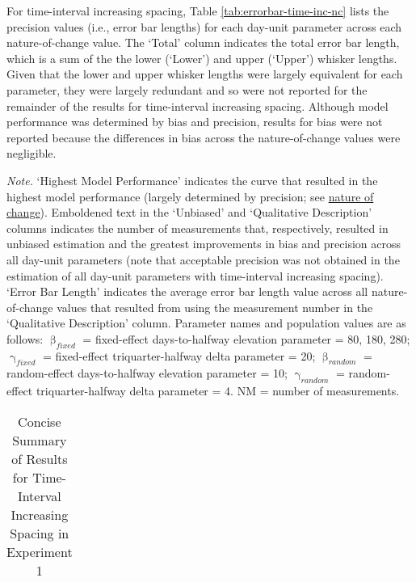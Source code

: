 \documentclass[
12pt, %
twoside,
english]{guelphthesis}
\begin{document}
For time-interval increasing spacing, Table \ref{tab:errorbar-time-inc-nc} lists the precision values (i.e., error bar lengths) for each day-unit parameter across each nature-of-change value. The `Total' column indicates the total error bar length, which is a sum of the the lower (`Lower') and upper (`Upper') whisker lengths. Given that the lower and upper whisker lengths were largely equivalent for each parameter, they were largely redundant and so were not reported for the remainder of the results for time-interval increasing spacing. Although model performance was determined by bias and precision, results for bias were not reported because the differences in bias across the nature-of-change values were negligible.

\begin{landscape}
\begin{ThreePartTable}
\begin{TableNotes}
\item \textit{Note. }`Highest Model Performance' indicates the curve that resulted in the highest model performance (largely determined by precision; see \hyperref[nature-change-time-inc-exp1]{nature of change}). Emboldened text in the `Unbiased' and `Qualitative Description' columns indicates the number of measurements that, respectively, resulted in unbiased estimation and the greatest improvements in bias and precision across all day-unit parameters (note that acceptable precision was not obtained in the estimation of all day-unit parameters with time-interval increasing spacing). `Error Bar Length' indicates the average error bar length value across all nature-of-change values that resulted from using the measurement number in the `Qualitative Description' column. Parameter names and population values are as follows: $\upbeta_{fixed}$ = fixed-effect days-to-halfway elevation parameter = {80, 180, 280}; $\upgamma_{fixed}$ = fixed-effect triquarter-halfway delta parameter = 20; $\upbeta_{random}$ = random-effect days-to-halfway elevation parameter = 10; $\upgamma_{random}$ = random-effect triquarter-halfway delta parameter = 4. NM = number of measurements.
\end{TableNotes}
\begin{longtable}[l]{>{\raggedright\arraybackslash}p{2cm}>{\centering\arraybackslash}p{5cm}>{\centering\arraybackslash}p{2.5cm}>{\centering\arraybackslash}p{3cm}>{\raggedright\arraybackslash}p{6.5cm}>{\centering\arraybackslash}p{3cm}}
\caption{\label{tab:summary-table-time-inc-exp1}Concise Summary of Results for Time-Interval Increasing Spacing in Experiment 1}\\

\end{longtable}
\end{ThreePartTable}
\end{landscape}
\end{document}
